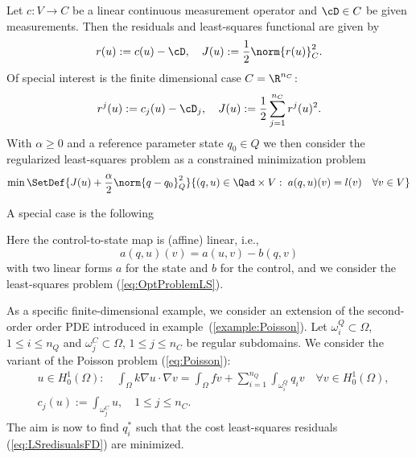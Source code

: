 %
\begin{example}\label{example:LeastSquares}
Let $c:V\to C$ be a linear continuous measurement operator and $\cD\in C$ be given measurements. Then 
the residuals and least-squares functional are given by
%
\begin{equation}\label{eq:LSredisuals}
r(u) := c(u) - \cD,\quad J(u) := \frac12\norm{r(u)}^2_C.
\end{equation}
%
Of special interest is the finite dimensional case $C=\R^{n_C}$:
%
\begin{equation}\label{eq:LSredisualsFD}
r^j(u) := c_j(u) - \cD_j,\quad J(u) := \frac12\sum_{j=1}^{n_C} r^j(u)^2.
\end{equation}
%
%
With $\alpha\ge0$ and a reference parameter state $q_0\in Q$ we then consider the regularized least-squares problem as a constrained minimization problem 
%
%
\begin{equation}\label{eq:OptProblemLS}
\min\SetDef{J(u) + \frac{\alpha}{2}\norm{q-q_0}^2_Q }{  (q,u)\in \Qad\times V:\; a(q,u)(v) = l(v)\quad\forall v\in V}
\end{equation}
\end{example}
%
A special case is the following
\begin{example}\label{example:LQ}
%
Here the control-to-state map is (affine) linear, i.e.,
%
\begin{equation}\label{eq:LQState}
a(q,u)(v) = a(u,v) - b(q,v)
\end{equation}
%
with two linear forms $a$ for the state and $b$ for the control, and we consider the least-squares problem 
(\ref{eq:OptProblemLS}).

As a specific finite-dimensional example, we consider an extension of the second-order order PDE introduced in example~(\ref{example:Poisson}).
Let $\omega_i^{Q}\subset\Omega$, $1\le i\le n_Q$ and $\omega_j^{C}\subset\Omega$, $1\le j\le n_C$ be regular subdomains. We consider the variant of the Poisson problem (\ref{eq:Poisson}):
%
\begin{equation}\label{eq:PoissonOC}
%
\begin{aligned}
&u\in H^1_0(\Omega):\quad \int_{\Omega}k\nabla u\cdot \nabla v = \int_{\Omega} fv 
+ \sum_{i=1}^{n_Q} \int_{\omega_i^{Q}} q_i v\quad\forall v\in  H^1_0(\Omega),\\
&c_j(u) := \int_{\omega_j^{C}}u,\quad 1\le j\le n_C.
\end{aligned}
%
\end{equation}
%
The aim is now to find $q^*_i$ such that the cost least-squares residuals (\ref{eq:LSredisualsFD}) are minimized.
\end{example}

